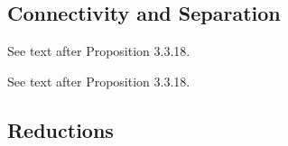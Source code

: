 \begin{definition}[$R_{12}$]
  \label{def:R12}
\end{definition}

\begin{definition}[$F_{7}$]
  \label{def:F7}
\end{definition}

\begin{definition}[$F_{7}^{*}$]
  \label{def:F7_dual}
\end{definition}

\begin{definition}[$M(K_{3,3})$]
  \label{def:M_K_3_3}
\end{definition}

\begin{definition}[$M(K_{3,3})^{*}$]
  \label{def:M_K_3_3_dual}
\end{definition}

\begin{definition}[$M(K_{5})$]
  \label{def:M_K_5}
\end{definition}

\begin{definition}[$M(K_{5})^{*}$]
  \label{def:M_K_5_dual}
\end{definition}


\subsection{Connectivity and Separation}

\begin{definition}[$k$-separation]
  \label{def:k_sep}
  See text after Proposition 3.3.18.
\end{definition}

\begin{definition}[$k$-connectivity]
  \label{def:k_conn}
  See text after Proposition 3.3.18.
\end{definition}


\subsection{Reductions}

\begin{definition}[deletion]
  \label{def:deletion}
\end{definition}

